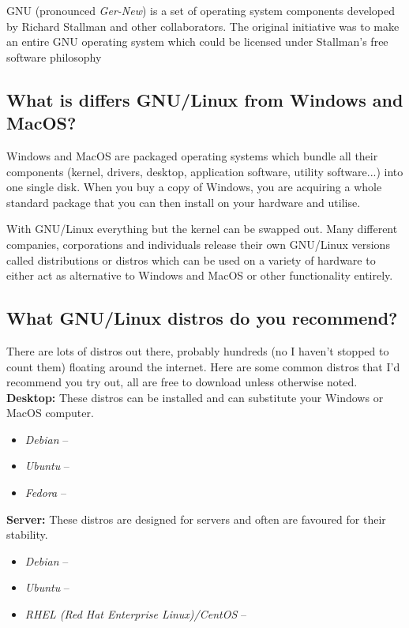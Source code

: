\documentclass{article}
\begin{document}
GNU (pronounced \textit{Ger-New}) is a set of operating system components developed by Richard Stallman and other collaborators. The original initiative was to make an entire GNU operating system which could be licensed under Stallman's free software philosophy

\subsection{What is differs GNU/Linux from Windows and MacOS?}

Windows and MacOS are packaged operating systems which bundle all their components (kernel, drivers, desktop, application software, utility software...) into one single disk. When you buy a copy of Windows, you are acquiring a whole standard package that you can then install on your hardware and utilise.


With GNU/Linux everything but the kernel can be swapped out. Many different companies, corporations and individuals release their own GNU/Linux versions called distributions or distros which can be used on a variety of hardware to either act as alternative to Windows and MacOS or other functionality entirely.

\subsection{What GNU/Linux distros do you recommend?}

There are lots of distros out there, probably hundreds (no I haven't stopped to count them) floating around the internet. Here are some common distros that I'd recommend you try out, all are free to download unless otherwise noted.\\

\textbf{Desktop:} These distros can be installed and can substitute your Windows or MacOS computer.

\begin{itemize}
    \item \textit{Debian} --
    \item \textit{Ubuntu} --
    \item \textit{Fedora} --
\end{itemize}

\textbf{Server:} These distros are designed for servers and often are favoured for their stability.

\begin{itemize}
    \item \textit{Debian} --
    \item \textit{Ubuntu} --
    \item \textit{RHEL (Red Hat Enterprise Linux)/CentOS} --
\end{itemize}
\end{document}
